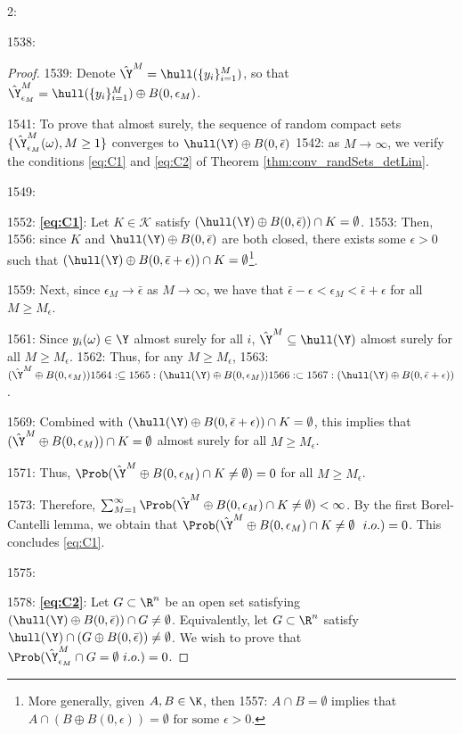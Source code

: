 2: \documentclass[12pt]{l4dc2022} %
\begin{document}
1538: \begin{proof} 
1539: Denote $\hat\Y^M=\hull(\{y_i\}_{i=1}^M)$, so that  $\hat\Y^M_{\epsilon_M}=\hull(\{y_i\}_{i=1}^M)\oplus B(0,\epsilon_M)$. 

1541: To prove that almost surely, the sequence of random compact sets $\{\hat\Y^M_{\epsilon_M}(\omega), M\geq 1\}$ converges to $\hull(\Y)\oplus B(0,\bar{\epsilon})$
1542:  as $M\rightarrow\infty$, we verify the conditions \eqref{eq:C1} and \eqref{eq:C2} of Theorem \ref{thm:conv_randSets_detLim}. 

1549: \vspace{2mm}

1552: \textbf{\eqref{eq:C1}}: Let $K\in \mathcal{K}$ satisfy $(\hull(\Y)\oplus B(0,\bar{\epsilon}))\cap K = \emptyset$. 
1553: Then, %
1556: since $K$ and $\hull(\Y)\oplus B(0,\bar{\epsilon})$ are both closed, there exists some $\epsilon>0$ such that $(\hull(\Y)\oplus B(0,\bar{\epsilon}+\epsilon))\cap K = \emptyset$\footnote{More generally, given $A,B\in\K$, then  
1557: $A\cap B=\emptyset$ implies that $A\cap(B\oplus B(0,\epsilon))=\emptyset \text{ for some $\epsilon>0$.}$}. 

1559:  Next, since $\epsilon_M\rightarrow\bar{\epsilon}$ as $M\rightarrow\infty$, we have that $\bar{\epsilon}-\epsilon<\epsilon_M<\bar{\epsilon}+\epsilon$ for all $M\geq M_{\epsilon}$. 

1561: Since $y_i(\omega)\in\Y$ almost surely for all $i$, $\hat\Y^M\subseteq\hull(\Y)$ almost surely for all $M\geq M_{\epsilon}$. 
1562: Thus, for any $M\geq M_{\epsilon}$, 
1563: $(\hat\Y^M\oplus B(0,\epsilon_M))
1564: \subseteq
1565: (\hull(\Y)\oplus B(0,\epsilon_M))
1566: \subset
1567: (\hull(\Y)\oplus B(0,\bar{\epsilon}+\epsilon))$. 

1569: Combined with $(\hull(\Y)\oplus B(0,\bar{\epsilon}+\epsilon))\cap K = \emptyset$, this implies that $(\hat\Y^M\oplus B(0,\epsilon_M))\cap K=\emptyset$ almost surely for all $M\geq M_{\epsilon}$. 

1571: 	Thus, $\Prob(\hat\Y^M\oplus B(0,\epsilon_M)\cap K\neq\emptyset)=0$ for all $M\geq M_{\epsilon}$. 

1573: 	Therefore, $\sum_{M=1}^\infty \Prob(\hat\Y^M\oplus B(0,\epsilon_M)\cap K\neq\emptyset)<\infty$. By the first Borel-Cantelli lemma, we obtain that $\Prob(\hat\Y^M\oplus B(0,\epsilon_M)\cap K \neq \emptyset \ \ i.o.) = 0$. This concludes \eqref{eq:C1}. 

1575: \vspace{2mm}

1578: \textbf{\eqref{eq:C2}}: Let $G\subset\R^n$ be an open set satisfying $(\hull(\Y)\oplus B(0,\bar{\epsilon}))\cap G \neq \emptyset$. Equivalently, let $G\subset\R^n$ satisfy $\hull(\Y)\cap (G \oplus B(0,\bar{\epsilon}))\neq \emptyset$. We wish to prove that $\Prob(\hat\Y^M_{\epsilon_M}\cap G  = \emptyset \ i.o.) = 0$. 


\end{proof}
\end{document}
